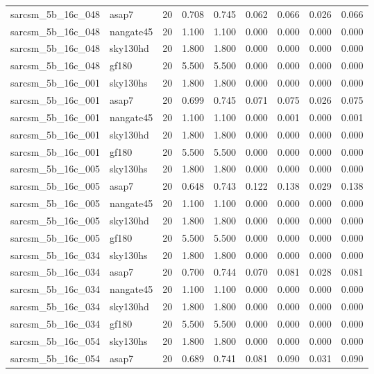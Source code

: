 \begin{tabular}{llrrrrrrr}
sarcsm\_5b\_16c\_048 & asap7 & 20 & 0.708 & 0.745 & 0.062 & 0.066 & 0.026 & 0.066 \\
sarcsm\_5b\_16c\_048 & nangate45 & 20 & 1.100 & 1.100 & 0.000 & 0.000 & 0.000 & 0.000 \\
sarcsm\_5b\_16c\_048 & sky130hd & 20 & 1.800 & 1.800 & 0.000 & 0.000 & 0.000 & 0.000 \\
sarcsm\_5b\_16c\_048 & gf180 & 20 & 5.500 & 5.500 & 0.000 & 0.000 & 0.000 & 0.000 \\
sarcsm\_5b\_16c\_001 & sky130hs & 20 & 1.800 & 1.800 & 0.000 & 0.000 & 0.000 & 0.000 \\
sarcsm\_5b\_16c\_001 & asap7 & 20 & 0.699 & 0.745 & 0.071 & 0.075 & 0.026 & 0.075 \\
sarcsm\_5b\_16c\_001 & nangate45 & 20 & 1.100 & 1.100 & 0.000 & 0.001 & 0.000 & 0.001 \\
sarcsm\_5b\_16c\_001 & sky130hd & 20 & 1.800 & 1.800 & 0.000 & 0.000 & 0.000 & 0.000 \\
sarcsm\_5b\_16c\_001 & gf180 & 20 & 5.500 & 5.500 & 0.000 & 0.000 & 0.000 & 0.000 \\
sarcsm\_5b\_16c\_005 & sky130hs & 20 & 1.800 & 1.800 & 0.000 & 0.000 & 0.000 & 0.000 \\
sarcsm\_5b\_16c\_005 & asap7 & 20 & 0.648 & 0.743 & 0.122 & 0.138 & 0.029 & 0.138 \\
sarcsm\_5b\_16c\_005 & nangate45 & 20 & 1.100 & 1.100 & 0.000 & 0.000 & 0.000 & 0.000 \\
sarcsm\_5b\_16c\_005 & sky130hd & 20 & 1.800 & 1.800 & 0.000 & 0.000 & 0.000 & 0.000 \\
sarcsm\_5b\_16c\_005 & gf180 & 20 & 5.500 & 5.500 & 0.000 & 0.000 & 0.000 & 0.000 \\
sarcsm\_5b\_16c\_034 & sky130hs & 20 & 1.800 & 1.800 & 0.000 & 0.000 & 0.000 & 0.000 \\
sarcsm\_5b\_16c\_034 & asap7 & 20 & 0.700 & 0.744 & 0.070 & 0.081 & 0.028 & 0.081 \\
sarcsm\_5b\_16c\_034 & nangate45 & 20 & 1.100 & 1.100 & 0.000 & 0.000 & 0.000 & 0.000 \\
sarcsm\_5b\_16c\_034 & sky130hd & 20 & 1.800 & 1.800 & 0.000 & 0.000 & 0.000 & 0.000 \\
sarcsm\_5b\_16c\_034 & gf180 & 20 & 5.500 & 5.500 & 0.000 & 0.000 & 0.000 & 0.000 \\
sarcsm\_5b\_16c\_054 & sky130hs & 20 & 1.800 & 1.800 & 0.000 & 0.000 & 0.000 & 0.000 \\
sarcsm\_5b\_16c\_054 & asap7 & 20 & 0.689 & 0.741 & 0.081 & 0.090 & 0.031 & 0.090 \\

\end{tabular}
